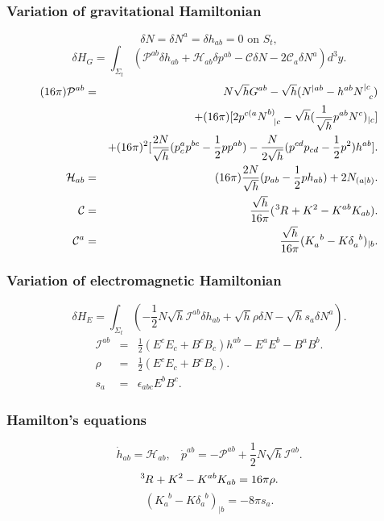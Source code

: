 \subsubsection{Variation of gravitational Hamiltonian}
\[\delta N = \delta N^a = \delta h_{ab} = 0 \mbox{ on } S_t,\]
\[\delta H_G = \int_{\Sigma_t} (\mathcal{P}^{ab} \delta h_{ab} + \mathcal{H}_{ab} \delta p^{ab} - \mathcal{C}\delta N - 2\mathcal{C}_a \delta N^a) d^3 y.\]
\begin{eqnarray}
(16\pi)\mathcal{P}^{ab} &=&  N\sqrt{h}G^{ab} - \sqrt{h}(N^{|ab} - h^{ab} N^{|c}_{\phantom{|c}c}) \nonumber \\
&\phantom{=}& +(16\pi)[2p^{c(a}N^{b)}_{\phantom{b)}|c} - \sqrt{h}(\frac{1}{\sqrt{h}}p^{ab}N^c)_{|c}] \nonumber \\
&\phantom{=}& + (16\pi)^2 [\frac{2N}{\sqrt{h}} (p^a_c p^{bc} - \frac{1}{2} p p^{ab}) - \frac{N}{2\sqrt{h}}(p^{cd}p_{cd} - \frac{1}{2} p^2)h^{ab}]. \nonumber \\
\mathcal{H}_{ab} &=& (16\pi) \frac{2N}{\sqrt{h}} (p_{ab} - \frac{1}{2}p h_{ab}) + 2N_{(a|b)} .\nonumber \\
\mathcal{C} &=& \frac{\sqrt{h}}{16\pi} (\tensor[^3]{R}{} + K^2 - K^{ab}K_{ab}) .\nonumber \\
\mathcal{C}^a &=& \frac{\sqrt{h}}{16\pi} (K_a^{\phantom{a}b} - K \delta_a^{\phantom{a}b})_{|b}. \nonumber 
\end{eqnarray}

\subsubsection{Variation of electromagnetic Hamiltonian}
\[\delta H_E = \int_{\Sigma_t}(-\frac{1}{2}N\sqrt{h}\mathcal{I}^{ab} \delta h_{ab} + \sqrt{h} \rho \delta N - \sqrt{h} s_a \delta N^a).\]
\begin{eqnarray}
\mathcal{I}^{ab} &=& \frac{1}{2}(E^c E_c + B^c B_c)h^{ab} - E^a E^b - B^a B^b. \nonumber \\
\rho &=& \frac{1}{2}(E^c E_c + B^c B_c) .\nonumber \\
s_a &=& \epsilon_{abc} E^b B^c .\nonumber
\end{eqnarray}

\subsubsection{Hamilton's equations}
\[\dot{h}_{ab} = \mathcal{H}_{ab}, \ \ \ \ \dot{p}^{ab} = -\mathcal{P}^{ab}+\frac{1}{2}N\sqrt{h}\mathcal{I}^{ab}.\]
\[\tensor[^3]{R}{} + K^2 - K^{ab}K_{ab} = 16 \pi \rho.\]
\[(K_a^{\phantom{a}b} - K \delta_a^{\phantom{a}b})_{|b} = -8\pi s_a.\]
